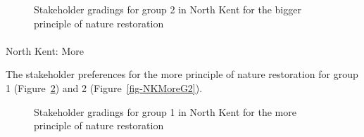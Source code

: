 \documentclass[
  12pt,
  letterpaper,
  DIV=11,
  numbers=noendperiod]{scrartcl}
\makeatletter
\let\oldparagraph\paragraph
\renewcommand{\paragraph}{
    \@ifstar
      \xxxParagraphStar
      \xxxParagraphNoStar
  }
\newcommand{\xxxParagraphStar}[1]{\oldparagraph*{#1}\mbox{}}
\newcommand{\xxxParagraphNoStar}[1]{\oldparagraph{#1}\mbox{}}
\makeatother
\begin{document}
\begin{figure}[H]


\caption{\label{fig-NKBigG2}Stakeholder gradings for group 2 in North
Kent for the bigger principle of nature restoration}

\end{figure}%

\newpage{}

\paragraph{North Kent: More}\label{north-kent-more}

The stakeholder preferences for the more principle of nature restoration
for group 1 (Figure~\ref{fig-NKMoreG1}) and 2
(Figure~\ref{fig-NKMoreG2}).

\begin{figure}[H]


\caption{\label{fig-NKMoreG1}Stakeholder gradings for group 1 in North
Kent for the more principle of nature restoration}

\end{figure}%
\end{document}
